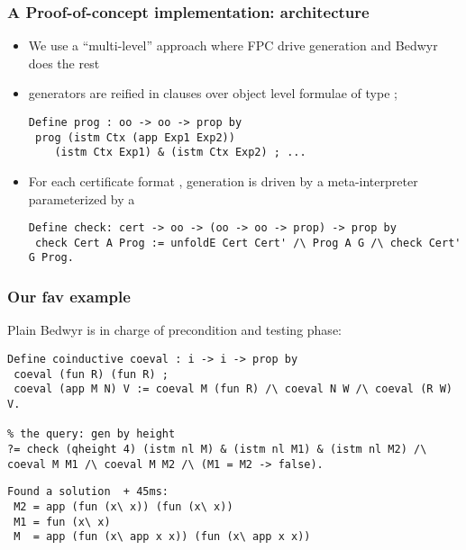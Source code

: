 \documentclass{beamer}
\begin{document}
\begin{frame}[fragile]
  \frametitle{A Proof-of-concept implementation: architecture}
  \begin{itemize}
  \item We use a ``multi-level'' approach where FPC drive generation and Bedwyr does the rest
    \item generators are reified in  clauses over object
      level formulae of type ;
      \begin{small}
\begin{lstlisting}
Define prog : oo -> oo -> prop by
 prog (istm Ctx (app Exp1 Exp2))
    (istm Ctx Exp1) & (istm Ctx Exp2) ; ...
\end{lstlisting}
      \end{small}
  \item For each certificate format ,
    generation is driven by a meta-interpreter 
    parameterized by a 
    \begin{small}
\begin{lstlisting}
Define check: cert -> oo -> (oo -> oo -> prop) -> prop by
 check Cert A Prog := unfoldE Cert Cert' /\ Prog A G /\ check Cert' G Prog.
\end{lstlisting}
  \end{small}




  \end{itemize}
\end{frame}


\begin{frame}[fragile]
  \frametitle{Our fav example}
  Plain Bedwyr is in charge of precondition and testing phase:
      \begin{small}
\begin{lstlisting}
Define coinductive coeval : i -> i -> prop by
 coeval (fun R) (fun R) ;
 coeval (app M N) V := coeval M (fun R) /\ coeval N W /\ coeval (R W) V.

% the query: gen by height
?= check (qheight 4) (istm nl M) & (istm nl M1) & (istm nl M2) /\ coeval M M1 /\ coeval M M2 /\ (M1 = M2 -> false).
\end{lstlisting}
      \end{small}
      \begin{small}
\begin{lstlisting}
Found a solution  + 45ms:
 M2 = app (fun (x\ x)) (fun (x\ x))
 M1 = fun (x\ x)
 M  = app (fun (x\ app x x)) (fun (x\ app x x))
\end{lstlisting}
      \end{small}
\end{frame}
\end{document}
